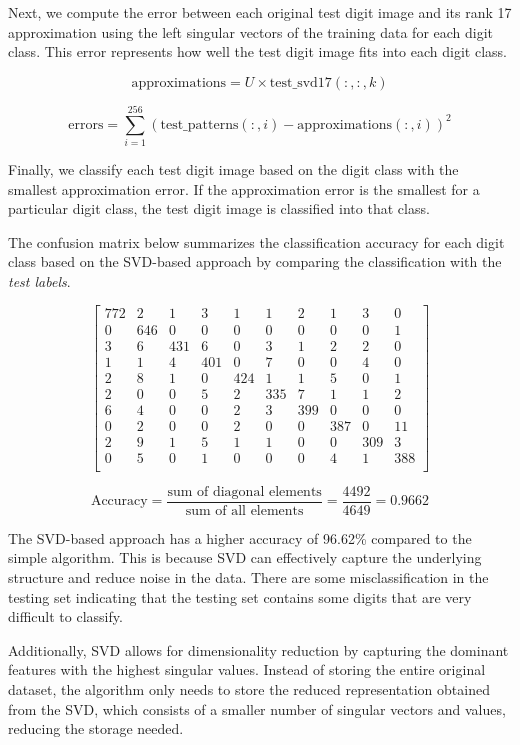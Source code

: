 \documentclass{article}
\begin{document}
Next, we compute the error between each original test digit image and its rank 17 approximation using the left singular vectors of the training data for each digit class. This error represents how well the test digit image fits into each digit class.
    
    \[
    \text{approximations} = U \times \text{test\_svd17}(:,:,k)
    \]
    
    \[
    \text{errors} = \sum_{i=1}^{256} (\text{test\_patterns}(:,i) - \text{approximations}(:,i))^2
    \]

Finally, we classify each test digit image based on the digit class with the smallest approximation error. If the approximation error is the smallest for a particular digit class, the test digit image is classified into that class.

The confusion matrix below summarizes the classification accuracy for each digit class based on the SVD-based approach by comparing the classification with the \textit{test labels}.

\[
\begin{bmatrix}
772 & 2 & 1 & 3 & 1 & 1 & 2 & 1 & 3 & 0 \\
0 & 646 & 0 & 0 & 0 & 0 & 0 & 0 & 0 & 1 \\
3 & 6 & 431 & 6 & 0 & 3 & 1 & 2 & 2 & 0 \\
1 & 1 & 4 & 401 & 0 & 7 & 0 & 0 & 4 & 0 \\
2 & 8 & 1 & 0 & 424 & 1 & 1 & 5 & 0 & 1 \\
2 & 0 & 0 & 5 & 2 & 335 & 7 & 1 & 1 & 2 \\
6 & 4 & 0 & 0 & 2 & 3 & 399 & 0 & 0 & 0 \\
0 & 2 & 0 & 0 & 2 & 0 & 0 & 387 & 0 & 11 \\
2 & 9 & 1 & 5 & 1 & 1 & 0 & 0 & 309 & 3 \\
0 & 5 & 0 & 1 & 0 & 0 & 0 & 4 & 1 & 388 \\
\end{bmatrix}
\]

\[
\text{Accuracy} = \frac{\text{sum of diagonal elements}}{\text{sum of all elements}} = \frac{4492}{4649} = 0.9662
\]

The SVD-based approach has a higher accuracy of 96.62\% compared to the simple algorithm. This is because SVD can effectively capture the underlying structure and reduce noise in the data. There are some misclassification in the testing set indicating that the testing set contains some digits that are very difficult to classify. 

Additionally, SVD allows for dimensionality reduction by capturing the dominant features with the highest singular values. Instead of storing the entire original dataset, the algorithm only needs to store the reduced representation obtained from the SVD, which consists of a smaller number of singular vectors and values, reducing the storage needed.
\end{document}
